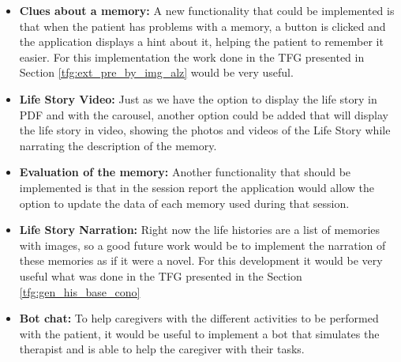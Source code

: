 \begin{itemize}
\item \textbf{Clues about a memory:} A new functionality that could be implemented is that when the patient has problems with a memory, a button is clicked and the application displays a hint about it, helping the patient to remember it easier. For this implementation the work done in the TFG presented in Section \ref{tfg:ext_pre_by_img_alz} would be very useful.
\item \textbf{Life Story Video:} Just as we have the option to display the life story in PDF and with the carousel, another option could be added that will display the life story in video, showing the photos and videos of the Life Story while narrating the description of the memory.
\item \textbf{Evaluation of the memory:} Another functionality that should be implemented is that in the session report the application would allow the option to update the data of each memory used during that session. 
\item \textbf{Life Story Narration:} Right now the life histories are a list of memories with images, so a good future work would be to implement the narration of these memories as if it were a novel. For this development it would be very useful what was done in the TFG presented in the Section \ref{tfg:gen_his_base_cono}
\item \textbf{Bot chat:} To help caregivers with the different activities to be performed with the patient, it would be useful to implement a bot that simulates the therapist and is able to help the caregiver with their tasks.
\end{itemize}